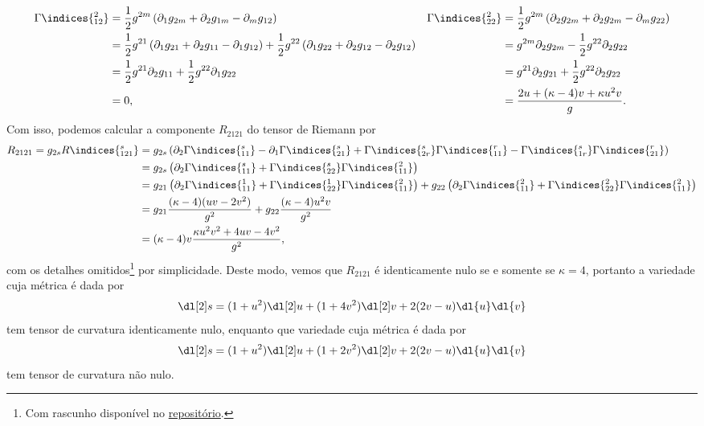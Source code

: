 \begin{align*}
    \Gamma\indices{^2_{12}} &= \frac12g^{2m}\left(\partial_1 g_{2m} + \partial_2 g_{1m} - \partial_m g_{12}\right)&
    \Gamma\indices{^2_{22}} &= \frac12g^{2m}\left(\partial_2 g_{2m} + \partial_2 g_{2m} - \partial_m g_{22}\right)\\
                            &= \frac12 g^{21}\left(\partial_1 g_{21} + \partial_2 g_{11} - \partial_1 g_{12}\right) + \frac12g^{22}\left(\partial_1g_{22} + \partial_2 g_{12} - \partial_2 g_{12}\right)&
                            &= g^{2m} \partial_2 g_{2m} - \frac12 g^{22} \partial_2 g_{22}\\
                            &= \frac12 g^{21}\partial_2 g_{11} + \frac12 g^{22}\partial_1g_{22}&
                            &= g^{21}\partial_2 g_{21} + \frac12g^{22}\partial_2 g_{22}\\
                            &= 0,&
                            &= \frac{2u + (\kappa - 4)v + \kappa u^2v}{g}.
\end{align*}
Com isso, podemos calcular a componente \(R_{2121}\) do tensor de Riemann por
\begin{align*}
    R_{2 1 2 1} = g_{2 s}R\indices{^s_{1 2 1}} &= g_{2 s} \left( \partial_{2}\Gamma\indices{^{s}_{11}}- \partial_{1}\Gamma\indices{^{s}_{21}} + \Gamma\indices{^s_{2r}} \Gamma\indices{^r_{11}} - \Gamma\indices{^s_{1r}} \Gamma\indices{^r_{21}} \right)\\
                                               &= g_{2 s} \left( \partial_{2}\Gamma\indices{^{s}_{11}} + \Gamma\indices{^s_{22}} \Gamma\indices{^2_{11}}\right)\\
                                               &= g_{2 1} \left( \partial_{2}\Gamma\indices{^{1}_{11}} + \Gamma\indices{^1_{22}} \Gamma\indices{^2_{11}}\right) + g_{2 2} \left( \partial_{2}\Gamma\indices{^{2}_{11}} + \Gamma\indices{^2_{22}} \Gamma\indices{^2_{11}}\right)\\
                                               &= g_{21}\frac{(\kappa-4)(uv - 2v^2)}{g^2} + g_{22} \frac{(\kappa - 4)u^2v}{g^2}\\
                                               &= (\kappa-4)v\frac{\kappa u^2 v^2 + 4 uv - 4v^2}{g^2},
\end{align*}
com os detalhes omitidos\footnote{Com rascunho disponível no \href{https://github.com/louisradial/4300337-relatividade/blob/main/lista4/rascunho_exercício_2.pdf}{repositório}.} por simplicidade. Deste modo, vemos que \(R_{2121}\) é identicamente nulo se e somente se \(\kappa = 4\), portanto a variedade cuja métrica é dada por
\begin{equation*}
    \dl[2]s = (1+u^2)\dl[2]u + (1+4v^2)\dl[2]v + 2(2v-u)\dl{u}\dl{v}
\end{equation*}
tem tensor de curvatura identicamente nulo, enquanto que variedade cuja métrica é dada por
\begin{equation*}
    \dl[2]s = (1+u^2)\dl[2]u + (1+2v^2)\dl[2]v + 2(2v-u)\dl{u}\dl{v}
\end{equation*}
tem tensor de curvatura não nulo.
